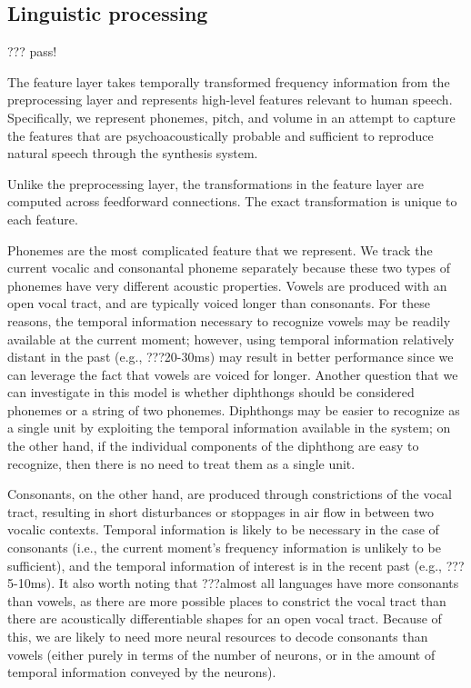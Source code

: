 \subsection{Linguistic processing}

??? pass!

The feature layer takes temporally transformed
frequency information from the preprocessing layer
and represents high-level features relevant
to human speech.
Specifically, we represent phonemes,
pitch, and volume in an attempt
to capture the features that are
psychoacoustically probable
and sufficient to reproduce
natural speech through the synthesis system.

Unlike the preprocessing layer,
the transformations in the feature layer
are computed across feedforward connections.
The exact transformation is unique to each feature.

Phonemes are the most complicated feature
that we represent.
We track
the current vocalic and consonantal phoneme separately
because these two types of phonemes
have very different acoustic properties.
Vowels are produced with an open vocal tract,
and are typically voiced longer than consonants.
For these reasons, the temporal information
necessary to recognize vowels
may be readily available at
the current moment;
however, using temporal information relatively
distant in the past (e.g., ???20-30ms)
may result in better performance since we can
leverage the fact that vowels are voiced for longer.
Another question that we can investigate in this model
is whether diphthongs should be considered phonemes
or a string of two phonemes.
Diphthongs may be easier to recognize as a single unit
by exploiting the temporal information available
in the system;
on the other hand, if the individual components
of the diphthong are easy to recognize,
then there is no need to treat them as a single unit.

Consonants, on the other hand, are produced
through constrictions of the vocal tract,
resulting in short disturbances or stoppages in air flow
in between two vocalic contexts.
Temporal information is likely to be necessary
in the case of consonants
(i.e., the current moment's frequency information
is unlikely to be sufficient),
and the temporal information of interest
is in the recent past (e.g., ???5-10ms).
It also worth noting that ???almost
all languages have more consonants than vowels,
as there are more possible places to constrict
the vocal tract than there are acoustically
differentiable shapes for an open vocal tract.
Because of this, we are likely to need
more neural resources to decode consonants
than vowels
(either purely in terms of the number of neurons,
or in the amount of temporal information conveyed
by the neurons).

